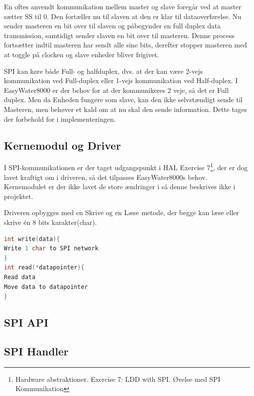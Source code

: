 En oftes anvendt kommunikation mellem master og slave foregår ved at master sætter SS til 0. Den fortæller nu til slaven at den er klar til 
dataoverførelse. Nu sender masteren en bit over til slaven og påbegynder en full duplex data transmission, samtidigt sender slaven en bit over
til masteren. Denne process fortsætter indtil masteren har sendt alle sine bits, derefter stopper masteren med at toggle på clocken og slave 
enheder bliver frigivet.

SPI kan køre både Full- og halfduplex, dvs. at der kan være 2-vejs kommunikation ved Full-duplex eller 1-vejs kommunikation ved Half-duplex. I EasyWater8000 er der behov for at der kommunikeres 2 veje, så det er Full duplex. Men da Enheden fungere som slave, kan den ikke selvstændigt sende til Masteren, men behøver et kald om at nu skal den sende information. Dette tages der forbehold for i implementeringen.

\subsection{Kernemodul og Driver}

I SPI-kommunikationen er der taget udgangspunkt i HAL Exercise 7\footnote{Hardware abstraktioner. Exercise 7: LDD with SPI. Øvelse med SPI Kommunikation}, der er dog lavet kraftigt om i driveren, så det tilpasses EasyWater8000s behov. Kernemodulet er der ikke lavet de store ændringer i så denne beskrives ikke i projektet.

Driveren opbygges med en Skrive og en Læse metode, der begge kan læse eller skrive én 8 bits karakter(char).

\begin{lstlisting}[language=C]
int write(data){
Write 1 char to SPI network
}
int read(*datapointer){
Read data
Move data to datapointer
}
\end{lstlisting}


\subsection{SPI API}




\subsection{SPI Handler}
